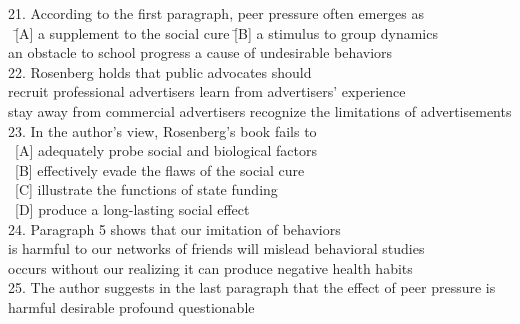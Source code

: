 \begin{tabbing}
21. According to the first paragraph, peer pressure often emerges as\\
\hspace{0cm}\ \=[A] a supplement to the social cure \quad\quad\quad\quad\= [B] a stimulus to group dynamics\\
\> [C] an obstacle to school progress	\> [D] a cause of undesirable behaviors\\

22. Rosenberg holds that public advocates should\\
\> [A] recruit professional advertisers \> [B] learn from advertisers’ experience\\
\> [C] stay away from commercial advertisers \> [D] recognize the limitations of advertisements\\

23. In the author’s view, Rosenberg’s book fails to \\
\ [A] adequately probe social and biological factors\\
\ [B] effectively evade the flaws of the social cure\\
\ [C] illustrate the functions of state funding  \\
\ [D] produce a long-lasting social effect\\

24. Paragraph 5 shows that our imitation of behaviors\\
\> [A] is harmful to our networks of friends \> [B] will mislead behavioral studies\\
\> [C] occurs without our realizing it \> [D] can produce negative health habits\\

25. The author suggests in the last paragraph that the effect of peer pressure is\\
\> [A] harmful \quad\quad [B] desirable  \> [C] profound \quad\quad [D] questionable\\
\end{tabbing}
